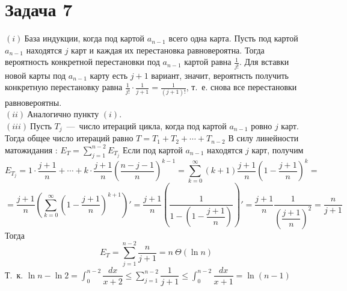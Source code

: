 \documentclass[a4paper,12pt]{article} %
\begin{document}
\section*{Задача 7}
$(i)~$База индукции, когда под картой $a_{n-1}$ всего одна карта. Пусть под картой $a_{n-1}$ находятся $j$ карт и каждая их перестановка равновероятна. Тогда вероятность конкретной перестановки под $a_{n-1}$ картой равна $\frac{1}{j!}$. Для вставки новой карты под $a_{n-1}$ карту есть $j+1$ вариант, значит, вероятнсть получить конкретную перестановку равна $\frac{1}{j!}\cdot\frac{1}{j+1} = \frac{1}{(j+1)!}$, т.~е. снова все перестановки равновероятны.\\
$(ii)~$Аналогично пункту $(i)$.\\
$(iii)~$Пусть $T_j$~---~число итераций цикла, когда под картой $a_{n-1}$ ровно $j$ карт. Тогда общее число итераций равно $T=T_1+T_2+ \cdots +T_{n-2}$ В силу линейности матожидания : $ E_T = \sum_{j=1}^{n-2}{E_{T_j}}$
Если под картой $a_{n-1}$ находятся $j$ карт, получим    
 \[
 E_{T_j} = 1\cdot \dfrac{j+1}{n} + \cdots + k\cdot \dfrac{j+1}{n}\left(\dfrac{n-j-1}{n}\right)^{k-1} = \sum_{k=0}^{\infty}{(k+1)\dfrac{j+1}{n}\left(1-\dfrac{j+1}{n}\right)^{k}}= 
 \]
 \[
= \dfrac{j+1}{n}\left(\sum_{k=0}^{\infty}{\left(1-\dfrac{j+1}{n}\right)^{k+1}}\right)' = \dfrac{j+1}{n}\left(\dfrac{1}{1-\left(1-\dfrac{j+1}{n}\right)}\right)' = \dfrac{j+1}{n}\dfrac{1}{\left(\dfrac{j+1}{n}\right)^2}=\dfrac{n}{j+1}
 \]
 Тогда 
 \[
 E_T = \sum_{j=1}^{n-2}{\dfrac{n}{j+1}} = n~\Theta(\ln{n})\]
 Т.~к. $\ln{n}-\ln 2 = \int_{0}^{n-2}\dfrac{dx}{x+2} \leq\sum_{j=1}^{n-2}{\dfrac{1}{j+1}}\leq  \int_{0}^{n-2}\dfrac{dx}{x+1} = \ln{(n-1)}  $  \\
 
 

 
\end{document}
